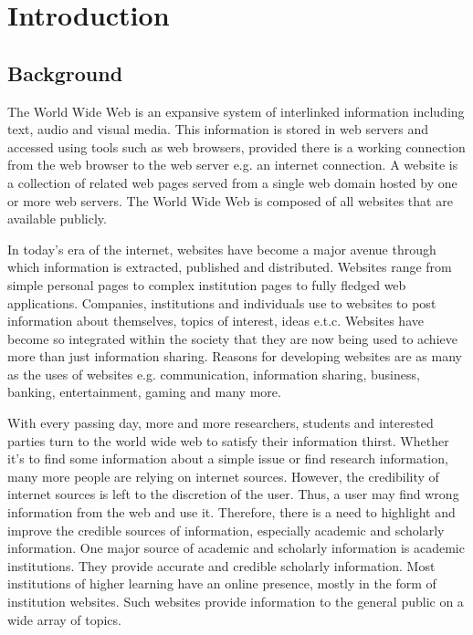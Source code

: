 \chapter{Introduction}
\section{Background}

\noindent
The World Wide Web is an expansive system of interlinked information including text, audio and visual media. This information is stored in web servers and accessed using tools such as web browsers, provided there is a working connection from the web browser to the web server e.g. an internet connection. A website is a collection of related web pages served from a single web domain hosted by one or more web servers. The World Wide Web is composed of all websites that are available publicly. \cite[p. 3]{aguillo2008} 

\noindent
In today's era of the internet, websites have become a major avenue through which information is extracted, published and distributed. Websites range from simple personal pages to complex institution pages to fully fledged web applications. Companies, institutions and individuals use to websites to post information about themselves, topics of interest, ideas e.t.c. Websites have become so integrated within the society that they are now being used to achieve more than just information sharing. Reasons for developing websites are as many as the uses of websites e.g. communication, information sharing, business, banking, entertainment, gaming and many more.

\noindent
With every passing day, more and more researchers, students and interested parties turn to the world wide web to satisfy their information thirst. Whether it's to find some information about a simple issue or find research information, many more people are relying on internet sources. However, the credibility of internet sources is left to the discretion of the user. Thus, a user may find wrong information from the web and use it. Therefore, there is a need to highlight and improve the credible sources of information, especially academic and scholarly information. One major source of academic and scholarly information is academic institutions. They provide accurate and credible scholarly information. Most institutions of higher learning have an online presence, mostly in the form of institution websites. Such websites provide information to the general public on a wide array of topics.

